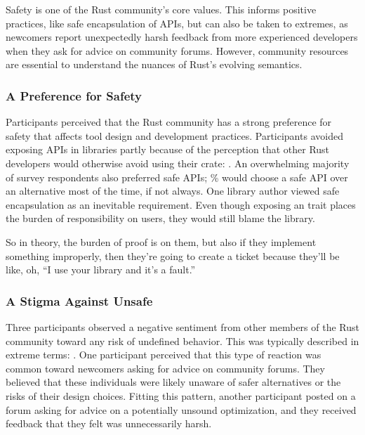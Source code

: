 Safety is one of the Rust community's core values. This informs positive practices, like safe encapsulation of \unsafe APIs, but can also be taken to extremes, as newcomers report unexpectedly harsh feedback from more experienced developers when they ask for advice on community forums. However, community resources are essential to understand the nuances of Rust's evolving semantics.
\subsubsection{A Preference for Safety}
Participants perceived that the Rust community has a strong preference for safety that affects tool design and development practices. Participants avoided exposing \unsafe APIs in libraries partly because of the perception that other Rust developers would otherwise avoid using their crate: .
An overwhelming majority of survey respondents also preferred safe APIs; \avoidedunsafeapi\% would choose a safe API over an \unsafe alternative most of the time, if not always. One library author viewed safe encapsulation as an inevitable requirement. Even though exposing an \unsafe trait places the burden of responsibility on users, they would still blame the library.

\begin{pquote}{7}
So in theory, the burden of proof is on them, but also if they implement something improperly, then they're going to create a ticket because they'll be like, oh, ``I use your library and it's a fault.''
\end{pquote}

\subsubsection{A Stigma Against Unsafe}
Three participants observed a negative sentiment from other members of the Rust community toward any risk of undefined behavior. This was typically described in extreme terms: . One participant perceived that this type of  reaction was common toward newcomers asking for advice on community forums. They believed that these individuals were likely unaware of safer alternatives or the risks of their design choices. Fitting this pattern, another participant posted on a forum asking for advice on a potentially unsound optimization, and they received feedback that they felt was unnecessarily harsh.



